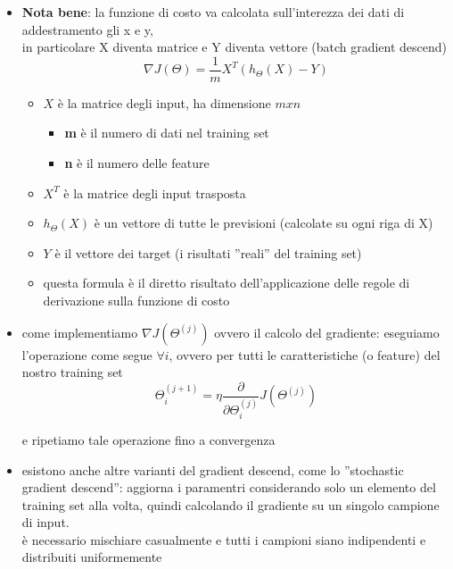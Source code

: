 \documentclass[10pt,oneside,a4paper]{article}
\newif\ifincludeimages
\begin{document}
\begin{itemize}
\item  \textbf{Nota bene}: la funzione di costo va calcolata sull'interezza dei dati di addestramento gli x e y, \\
in particolare X diventa matrice e Y diventa vettore (batch gradient descend)
$$\nabla J(\Theta)=\frac{1}{m}X^{T}(h_{\Theta}(X)-Y)$$
 \begin{itemize}
\item $X$ è la matrice degli input, ha dimensione $mxn$
\begin{itemize}
\item \textbf{m}  è il numero di dati  nel training set
\item \textbf{n} è il numero delle feature
\end{itemize}
\item $X^{T}$ è la matrice degli input trasposta
\item $h_{\Theta}(X)$ è un vettore di tutte le previsioni (calcolate su ogni riga di X)
\item $Y$ è il vettore dei target (i risultati ''reali'' del training set)
\item questa formula è il diretto risultato dell'applicazione delle regole di derivazione sulla funzione di costo

\end{itemize}
\item come implementiamo $\nabla J(\Theta^{(j)})$ ovvero il calcolo del gradiente:
eseguiamo l'operazione come segue $\forall i$, ovvero per tutti le caratteristiche (o feature) del nostro training set
$$\Theta^{(j+1)}_{i}=\eta \frac{\partial}{\partial \Theta^{(j)}_{i}} J(\Theta^{(j)})$$
 
e ripetiamo tale operazione fino a convergenza

\item esistono anche altre varianti del gradient descend, come lo ''stochastic gradient descend'':
aggiorna i paramentri considerando solo un elemento del training set alla volta, quindi calcolando il gradiente su un singolo campione di input. \\
è necessario mischiare casualmente e tutti i campioni siano indipendenti e distribuiti uniformemente

\end{itemize}

\ifincludeimages
\end{document}
